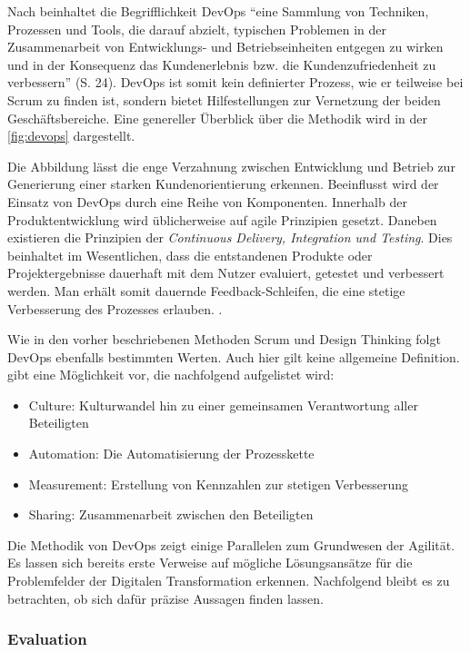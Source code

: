 Nach  beinhaltet die Begrifflichkeit DevOps ``eine Sammlung von Techniken, Prozessen und Tools, die darauf abzielt, typischen Problemen in der Zusammenarbeit von Entwicklungs- und Betriebseinheiten entgegen zu wirken und in der Konsequenz das Kundenerlebnis bzw. die Kundenzufriedenheit zu verbessern'' (S. 24). DevOps ist somit kein definierter Prozess, wie er teilweise bei Scrum zu finden ist, sondern bietet Hilfestellungen zur Vernetzung der beiden Geschäftsbereiche. Eine genereller Überblick über die Methodik wird in der \ref{fig:devops} dargestellt.


Die Abbildung lässt die enge Verzahnung zwischen Entwicklung und Betrieb zur Generierung einer starken Kundenorientierung erkennen. Beeinflusst wird der Einsatz von DevOps durch eine Reihe von Komponenten. Innerhalb der Produktentwicklung wird üblicherweise auf agile Prinzipien gesetzt. Daneben existieren die Prinzipien der \textit{Continuous Delivery, Integration und Testing}. Dies beinhaltet im Wesentlichen, dass die entstandenen Produkte oder Projektergebnisse dauerhaft mit dem Nutzer evaluiert, getestet und verbessert werden. Man erhält somit dauernde Feedback-Schleifen, die eine stetige Verbesserung des Prozesses erlauben. \cite{alt_innovationsorientiertes_2017}.

Wie in den vorher beschriebenen Methoden Scrum und Design Thinking folgt DevOps ebenfalls bestimmten Werten. Auch hier gilt keine allgemeine Definition.  gibt eine Möglichkeit vor, die nachfolgend aufgelistet wird:

\begin{itemize}[noitemsep, topsep=0pt]
	\item Culture: Kulturwandel hin zu einer gemeinsamen Verantwortung aller Beteiligten
	\item Automation: Die Automatisierung der Prozesskette
	\item Measurement: Erstellung von Kennzahlen zur stetigen Verbesserung
	\item Sharing: Zusammenarbeit zwischen den Beteiligten
\end{itemize}

Die Methodik von DevOps zeigt einige Parallelen zum Grundwesen der Agilität. Es lassen sich bereits erste Verweise auf mögliche Lösungsansätze für die Problemfelder der Digitalen Transformation erkennen. Nachfolgend bleibt es zu betrachten, ob sich dafür präzise Aussagen finden lassen. 

\subsubsection{Evaluation}

